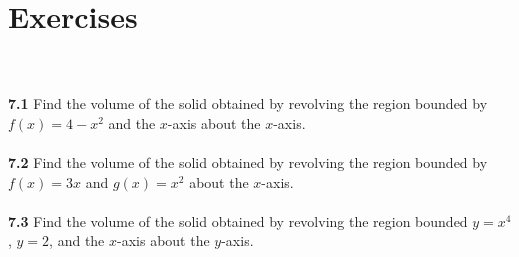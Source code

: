 \documentclass[11pt]{scrartcl}
\begin{document}
\section{Exercises} \\
\\
\noindent 
\textbf{7.1} Find the volume of the solid obtained by revolving the region bounded by $f(x)=4-x^2$ and the $x$-axis about the $x$-axis.\\
\\
\noindent 
\textbf{7.2} Find the volume of the solid obtained by revolving the region bounded by $f(x)=3x$ and $g(x)=x^2$ about the $x$-axis. \\
\\
\noindent 
\textbf{7.3} Find the volume of the solid obtained by revolving the region bounded $y=x^4$, $y=2$, and the $x$-axis about the $y$-axis.\\
\end{document}
